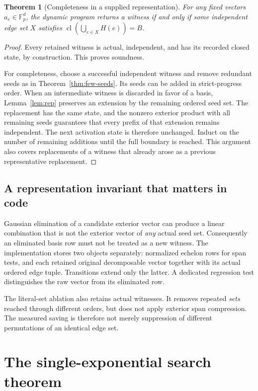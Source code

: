 \documentclass[11pt,letterpaper]{article}
\newtheorem{theorem}{Theorem}[section]
\theoremstyle{definition}
\newcommand{\F}{\mathbb F}
\newcommand{\cl}{\operatorname{cl}}
\begin{document}
\begin{theorem}[Completeness in a supplied representation]\label{thm:dp}
For any fixed vectors $a_e\in\F_p^d$, the dynamic program returns a witness
if and only if some independent edge set $X$ satisfies
$\cl(\bigcup_{e\in X}H(e))=B$.
\end{theorem}
\begin{proof}
Every retained witness is actual, independent, and has its recorded closed
state, by construction. This proves soundness.

For completeness, choose a successful independent witness and remove
redundant seeds as in Theorem~\ref{thm:few-seeds}. Its seeds can be added in
strict-progress order. When an intermediate witness is discarded in favor
of a basis, Lemma~\ref{lem:rep} preserves an extension by the remaining
ordered seed set. The replacement has the same state, and the nonzero
exterior product with all remaining seeds guarantees that every prefix of
that extension remains independent. The next activation state is therefore
unchanged. Induct on the number of remaining additions until the full
boundary is reached. This argument also covers replacements of a witness
that already arose as a previous representative replacement.
\end{proof}

\subsection{A representation invariant that matters in code}
Gaussian elimination of a candidate exterior vector can produce a linear
combination that is not the exterior vector of \emph{any} actual seed set.
Consequently an eliminated basis row must not be treated as a new witness.
The implementation stores two objects separately: normalized echelon rows
for span tests, and each retained original decomposable vector together with
its actual ordered edge tuple. Transitions extend only the latter. A dedicated
regression test distinguishes the raw vector from its eliminated row.

The literal-set ablation also retains actual witnesses. It removes repeated
\emph{sets} reached through different orders, but does not apply exterior
span compression. The measured saving is therefore not merely suppression
of different permutations of an identical edge set.

\section{The single-exponential search theorem}\label{sec:main}
\end{document}
